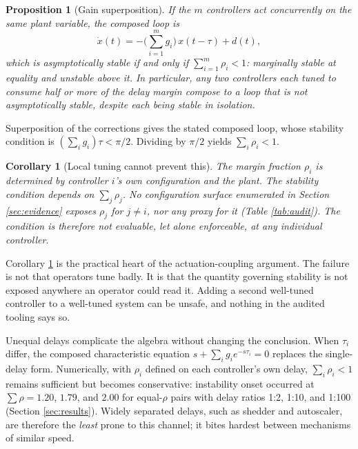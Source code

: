 \documentclass[conference]{IEEEtran}
\newtheorem{proposition}{Proposition}
\newtheorem{corollary}{Corollary}
\begin{document}
\begin{proposition}[Gain superposition]
\label{prop:superpose}
If the $m$ controllers act concurrently on the same plant variable, the
composed loop is
\[
\dot{x}(t) = -\Big(\textstyle\sum_{i=1}^{m} g_i\Big)\, x(t - \tau) + d(t) ,
\]
which is asymptotically stable if and only if $\sum_{i=1}^{m} \rho_i < 1$:
marginally stable at equality and unstable above it. In particular,
any two controllers each tuned to consume half or more of the delay margin
compose to a loop that is not asymptotically stable, despite each being stable in isolation.
\end{proposition}

\begin{IEEEproof}
Superposition of the corrections gives the stated composed loop, whose
stability condition is $\left(\sum_i g_i\right)\tau < \pi/2$. Dividing by
$\pi/2$ yields $\sum_i \rho_i < 1$.
\end{IEEEproof}

\begin{corollary}[Local tuning cannot prevent this]
\label{cor:local}
The margin fraction $\rho_i$ is determined by controller $i$'s own
configuration and the plant. The stability condition depends on
$\sum_j \rho_j$. No configuration surface enumerated in Section
\ref{sec:evidence} exposes $\rho_j$ for $j \neq i$, nor any proxy for it (Table \ref{tab:audit}).
The condition is therefore not evaluable, let alone enforceable, at any
individual controller.
\end{corollary}

Corollary \ref{cor:local} is the practical heart of the actuation-coupling
argument. The failure is not that operators tune badly. It is that the
quantity governing stability is not exposed anywhere an operator could read
it. Adding a second well-tuned controller to a well-tuned system can be
unsafe, and nothing in the audited tooling says so.

Unequal delays complicate the algebra without changing the conclusion. When
$\tau_i$ differ, the composed characteristic equation
$s + \sum_i g_i e^{-s\tau_i} = 0$ replaces the single-delay form. Numerically,
with $\rho_i$ defined on each controller's own delay, $\sum_i\rho_i<1$ remains
sufficient but becomes conservative: instability onset occurred at
$\sum\rho = 1.20$, $1.79$, and $2.00$ for equal-$\rho$ pairs with delay ratios
1:2, 1:10, and 1:100 (Section \ref{sec:results}). Widely separated delays,
such as shedder and autoscaler, are therefore the \emph{least} prone to this
channel; it bites hardest between mechanisms of similar speed.
\end{document}
